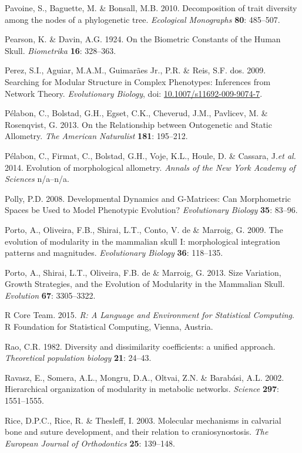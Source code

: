 \documentclass[12pt,twoside]{report}
\begin{document}
Pavoine, S., Baguette, M. \& Bonsall, M.B. 2010. Decomposition of trait
diversity among the nodes of a phylogenetic tree. \emph{Ecological
Monographs} \textbf{80}: 485--507.

Pearson, K. \& Davin, A.G. 1924. On the Biometric Constants of the Human
Skull. \emph{Biometrika} \textbf{16}: 328--363.

Perez, S.I., Aguiar, M.A.M., Guimarães Jr., P.R. \& Reis, S.F. dos.
2009. Searching for Modular Structure in Complex Phenotypes: Inferences
from Network Theory. \emph{Evolutionary Biology}, doi:
\href{http://dx.doi.org/10.1007/s11692-009-9074-7}{10.1007/s11692-009-9074-7}.

Pélabon, C., Bolstad, G.H., Egset, C.K., Cheverud, J.M., Pavlicev, M. \&
Rosenqvist, G. 2013. On the Relationship between Ontogenetic and Static
Allometry. \emph{The American Naturalist} \textbf{181}: 195--212.

Pélabon, C., Firmat, C., Bolstad, G.H., Voje, K.L., Houle, D. \&
Cassara, J.\emph{et al.} 2014. Evolution of morphological allometry.
\emph{Annals of the New York Academy of Sciences} n/a--n/a.

Polly, P.D. 2008. Developmental Dynamics and G-Matrices: Can
Morphometric Spaces be Used to Model Phenotypic Evolution?
\emph{Evolutionary Biology} \textbf{35}: 83--96.

Porto, A., Oliveira, F.B., Shirai, L.T., Conto, V. de \& Marroig, G.
2009. The evolution of modularity in the mammalian skull I:
morphological integration patterns and magnitudes. \emph{Evolutionary
Biology} \textbf{36}: 118--135.

Porto, A., Shirai, L.T., Oliveira, F.B. de \& Marroig, G. 2013. Size
Variation, Growth Strategies, and the Evolution of Modularity in the
Mammalian Skull. \emph{Evolution} \textbf{67}: 3305--3322.

R Core Team. 2015. \emph{R: A Language and Environment for Statistical
Computing}. R Foundation for Statistical Computing, Vienna, Austria.

Rao, C.R. 1982. Diversity and dissimilarity coefficients: a unified
approach. \emph{Theoretical population biology} \textbf{21}: 24--43.

Ravasz, E., Somera, A.L., Mongru, D.A., Oltvai, Z.N. \& Barabási, A.L.
2002. Hierarchical organization of modularity in metabolic networks.
\emph{Science} \textbf{297}: 1551--1555.

Rice, D.P.C., Rice, R. \& Thesleff, I. 2003. Molecular mechanisms in
calvarial bone and suture development, and their relation to
craniosynostosis. \emph{The European Journal of Orthodontics}
\textbf{25}: 139--148.
\end{document}
